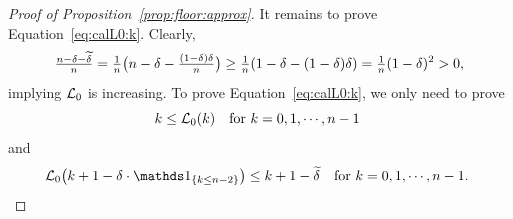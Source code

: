 \documentclass[nohyperref]{article}
\theoremstyle{plain}
\theoremstyle{definition}
\theoremstyle{remark}
\begin{document}
\begin{proof}[Proof of Proposition~\ref{prop:floor:approx}]
%
%



It remains to prove Equation~\eqref{eq:calL0:k}. 
Clearly,
\begin{equation*}
    \tfrac{n-\delta-{\widetilde{\delta}}}{n}=\tfrac{1}{n}\big(n-\delta-\tfrac{(1-\delta)\delta}{n}\big)\ge 
\tfrac{1}{n}(1-\delta-(1-\delta)\delta)=\tfrac{1}{n}(1-\delta)^2> 0,
\end{equation*}
implying ${\mathcal{L}}_0$ is increasing. 
To prove Equation~\eqref{eq:calL0:k},
we only need to prove%
\begin{equation}\label{eq:k:calL0:left}
	k\le \calL_0(k)\quad \tn{for $k=0,1,\dotsc,n-1$ }
\end{equation}
and 
\begin{equation}\label{eq:k:calL0:right}
	 \calL_0\big(k+1-\delta\cdot\one_{\{k\le n-2\}}\big)\le k+1-\tildedelta\quad \tn{for $k=0,1,\dotsc,n-1$. }
\end{equation}


\end{proof}
\end{document}
